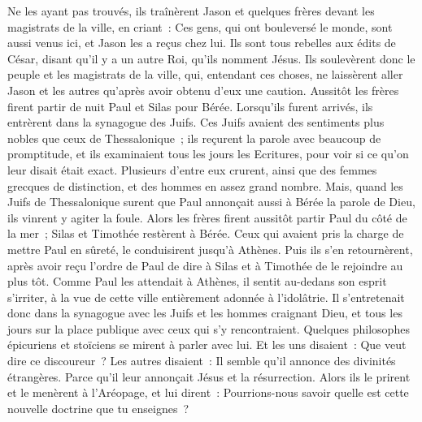 \begin{multicols}{2}
Ne les ayant pas trouvés, ils traînèrent Jason et quelques frères devant les magistrats de la ville, en criant~: Ces gens, qui ont bouleversé le monde, sont aussi venus ici, et Jason les a reçus chez lui.
Ils sont tous rebelles aux édits de César, disant qu'il y a un autre Roi, qu'ils nomment Jésus.
Ils soulevèrent donc le peuple et les magistrats de la ville, qui, entendant ces choses,
ne laissèrent aller Jason et les autres qu'après avoir obtenu d'eux une caution. 
Aussitôt les frères firent partir de nuit Paul et Silas pour Bérée. Lorsqu'ils furent arrivés, ils entrèrent dans la synagogue des Juifs.
Ces Juifs avaient des sentiments plus nobles que ceux de Thessalonique~; ils reçurent la parole avec beaucoup de promptitude, et ils examinaient tous les jours les Ecritures, pour voir si ce qu'on leur disait était exact.
Plusieurs d'entre eux crurent, ainsi que des femmes grecques de distinction, et des hommes en assez grand nombre.
Mais, quand les Juifs de Thessalonique surent que Paul annonçait aussi à Bérée la parole de Dieu, ils vinrent y agiter la foule.
Alors les frères firent aussitôt partir Paul du côté de la mer~; Silas et Timothée restèrent à Bérée.
Ceux qui avaient pris la charge de mettre Paul en sûreté, le conduisirent jusqu'à Athènes. Puis ils s'en retournèrent, après avoir reçu l'ordre de Paul de dire à Silas et à Timothée de le rejoindre au plus tôt.
Comme Paul les attendait à Athènes, il sentit au-dedans son esprit s'irriter, à la vue de cette ville entièrement adonnée à l'idolâtrie.
Il s'entretenait donc dans la synagogue avec les Juifs et les hommes craignant Dieu, et tous les jours sur la place publique avec ceux qui s'y rencontraient.
Quelques philosophes épicuriens et stoïciens se mirent à parler avec lui. Et les uns disaient~: Que veut dire ce discoureur~? Les autres disaient~: Il semble qu'il annonce des divinités étrangères. Parce qu'il leur annonçait Jésus et la résurrection.
Alors ils le prirent et le menèrent à l'Aréopage, et lui dirent~: Pourrions-nous savoir quelle est cette nouvelle doctrine que tu enseignes~?

\end{multicols}
